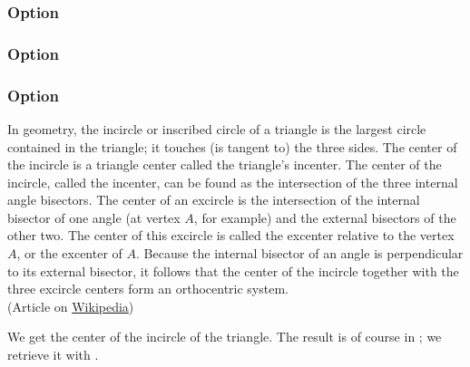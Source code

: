 \subsubsection{Option }
\begin{tkzexample}[latex=6cm,small]
\end{tkzexample}

\subsubsection{Option }
\begin{tkzexample}[latex=6cm,small]
\end{tkzexample}

\subsubsection{Option }
In geometry, the incircle or inscribed circle of a triangle is the largest circle contained in the triangle; it touches (is tangent to) the three sides. The center of the incircle is a triangle center called the triangle's incenter.
The center of the incircle, called the incenter, can be found as the intersection of the three internal angle bisectors. The center of an excircle is the intersection of the internal bisector of one angle (at vertex $A$, for example) and the external bisectors of the other two. The center of this excircle is called the excenter relative to the vertex $A$, or the excenter of $A$. Because the internal bisector of an angle is perpendicular to its external bisector, it follows that the center of the incircle together with the three excircle centers form an orthocentric system.\\
(Article on \href{https://en.wikipedia.org/wiki/Incircle_and_excircles_of_a_triangle}{Wikipedia})

 \medskip
 We get the center of the incircle of the triangle. The result is of course in ; we retrieve it with .

